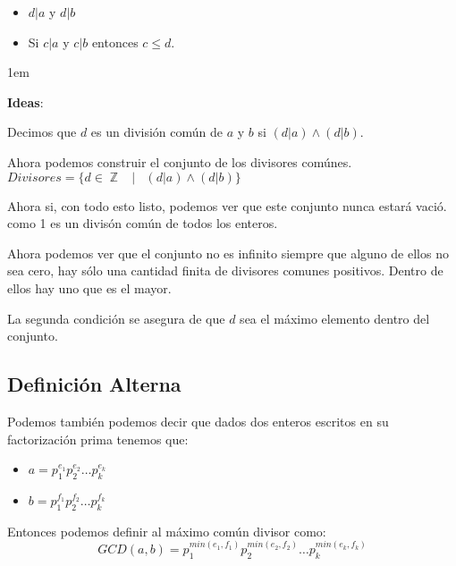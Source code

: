 \documentclass[12pt, fleqn]{report}                             %
\newenvironment{SmallIndentation}[1][0.75em]                    %
    {\begin{adjustwidth}{#1}{}\begin{footnotesize}}                 %
    {\end{footnotesize}\end{adjustwidth}}                           %
\DeclareMathOperator \Space {\quad}                             %
\DeclareMathOperator \MiniSpace {\;}                            %
\newcommand \Such {\MiniSpace|\MiniSpace}                       %
\DeclareMathOperator \Integers  {\mathbb{Z}}                     %
\begin{document}
            \begin{itemize}
                \item $d|a$ y $d|b$
                \item Si $c|a$ y $c|b$ entonces $c \leq d$.
            \end{itemize}


            \begin{SmallIndentation}[1em]
                \textbf{Ideas}:

                Decimos que $d$ es un división común de $a$ y $b$ si $(d|a) \land (d|b)$.

                Ahora podemos construir el conjunto de los divisores comúnes.
                $Divisores = \{ d \in \Integers \Such (d|a) \land (d|b) \}$

                Ahora si, con todo esto listo, podemos ver que este conjunto nunca estará vació. 
                como 1 es un divisón común de todos los enteros.

                Ahora podemos ver que el conjunto no es infinito siempre que alguno de ellos no sea cero,
                hay sólo una cantidad finita de divisores comunes positivos. Dentro de ellos hay uno
                que es el mayor.

                La segunda condición se asegura de que $d$ sea el máximo elemento dentro del conjunto.

            \end{SmallIndentation}


        \subsection*{Definición Alterna}

            Podemos también podemos decir que dados dos enteros escritos en 
            su factorización prima tenemos que:
            \begin{itemize}
                \item $a = p_1^{e_1} p_2^{e_2} \dots p_k^{e_k}$
                \item $b = p_1^{f_1} p_2^{f_2} \dots p_k^{f_k}$
            \end{itemize}

            Entonces podemos definir al máximo común divisor como:
            \begin{equation}
                GCD(a, b) = p_1^{min(e_1, f_1)} p_2^{min(e_2, f_2)} \dots p_k^{min(e_k, f_k)}
            \end{equation}
\end{document}
